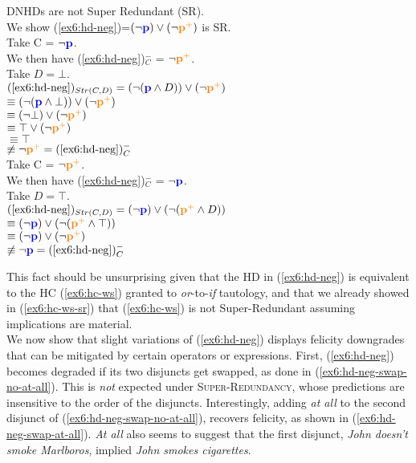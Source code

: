 \begin{exe}
	\ex\label{ex6:hd-neg-sr} {DNHDs are not Super Redundant (SR).\\
		We show (\ref{ex6:hd-neg})=$(\neg\textbf{\textcolor{blue}{p}})\vee(\neg\textbf{\textcolor{orange}{p$^+$}})$ is SR.\\
		Take C = $\neg\textbf{\textcolor{blue}{p}}$.\\
		We then have (\ref{ex6:hd-neg})$^-_C$ = $\neg\textbf{\textcolor{orange}{p$^+$}}$.\\
		Take $D=\bot$.\\
		$(\textref{ex6:hd-neg})_{Str(C, D)} = (\neg(\p \wedge D)) \vee (\neg\pplus)$\\
		 $\equiv (\neg(\textbf{\textcolor{blue}{p}} \wedge \bot)) \vee (\neg\textbf{\textcolor{orange}{p$^+$}})$\\
		 $\equiv (\neg\bot) \vee (\neg\textbf{\textcolor{orange}{p$^+$}})$\\
		 $\equiv \top \vee (\neg\textbf{\textcolor{orange}{p$^+$}})$\\
		 $\equiv \top$\\
		 $\not\equiv \neg\pplus = (\textref{ex6:hd-neg})^-_C$\\
		Take C = $\neg\textbf{\textcolor{orange}{p$^+$}}$.\\
		We then have (\ref{ex6:hd-neg})$^-_C$ = $\neg\textbf{\textcolor{blue}{p}}$.\\
		Take $D=\top$.\\
		$(\textref{ex6:hd-neg})_{Str(C, D)} = (\neg\p) \vee (\neg(\pplus \wedge D))$\\
		 $\equiv   (\neg\textbf{\textcolor{blue}{p}})\vee(\neg(\textbf{\textcolor{orange}{p$^+$}} \wedge \top))$\\
		 $\equiv  (\neg\textbf{\textcolor{blue}{p}})\vee(\neg\textbf{\textcolor{orange}{p$^+$}}) $\\
		 $\not\equiv \neg\p = (\textref{ex6:hd-neg})^-_C$
	}
\end{exe}

This fact should be unsurprising given that the HD in (\ref{ex6:hd-neg}) is equivalent to the HC (\ref{ex6:hc-ws}) granted to \textit{or}-to-\textit{if} tautology, and that we already showed in (\ref{ex6:hc-ws-sr}) that (\ref{ex6:hc-ws}) is not Super-Redundant assuming implications are material.\\

We now show that slight variations of (\ref{ex6:hd-neg}) displays felicity downgrades that can be mitigated by certain operators or expressions. First, (\ref{ex6:hd-neg}) becomes degraded if its two disjuncts get swapped, as done in (\ref{ex6:hd-neg-swap-no-at-all}). This is \textit{not} expected under \textsc{Super-Redundancy}, whose predictions are insensitive to the order of the disjuncts. Interestingly, adding \textit{at all} to the second disjunct of (\ref{ex6:hd-neg-swap-no-at-all}), recovers felicity, as shown in (\ref{ex6:hd-neg-swap-at-all}). \textit{At all} also seems to suggest that the first disjunct, \textit{John doesn't smoke Marlboros}, implied \textit{John smokes cigarettes}. 

